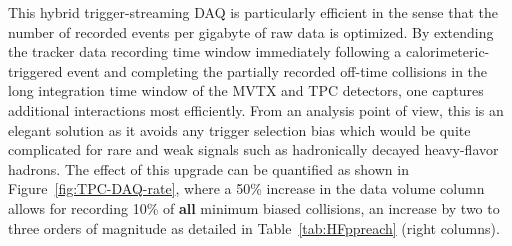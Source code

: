 This hybrid trigger-streaming DAQ is particularly efficient in the
sense that the number of recorded events per gigabyte of raw data is
optimized.  By extending the tracker data recording time window
immediately following a calorimeteric-triggered event and completing
the partially recorded off-time collisions in the long integration
time window of the MVTX and TPC detectors, one captures additional
interactions most efficiently.  From an analysis point of view, this
is an elegant solution as it avoids any trigger selection bias which
would be quite complicated for rare and weak signals such as
hadronically decayed heavy-flavor hadrons.  The effect of this upgrade
can be quantified as shown in Figure~\ref{fig:TPC-DAQ-rate}, where a
50\% increase in the data volume column allows for recording 10\% of
{\bf all} minimum biased collisions, an increase by two to three
orders of magnitude as detailed in Table~\ref{tab:HFppreach} (right
columns).

 



 




